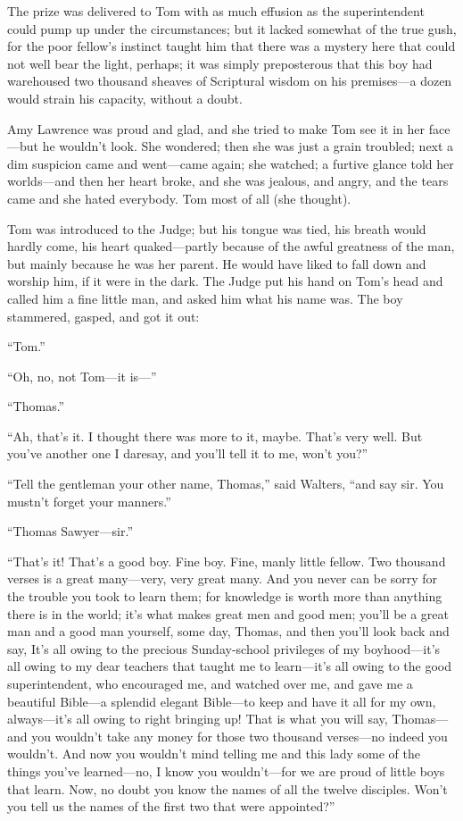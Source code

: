 \documentclass{book}
\begin{document}
The prize was delivered to Tom with as much effusion as the superintendent could pump up under the circumstances; but it lacked somewhat of the true gush, for the poor fellow’s instinct taught him that there was a mystery here that could not well bear the light, perhaps; it was simply preposterous that this boy had warehoused two thousand sheaves of Scriptural wisdom on his premises—a dozen would strain his capacity, without a doubt.

Amy Lawrence was proud and glad, and she tried to make Tom see it in her face—but he wouldn’t look. She wondered; then she was just a grain troubled; next a dim suspicion came and went—came again; she watched; a furtive glance told her worlds—and then her heart broke, and she was jealous, and angry, and the tears came and she hated everybody. Tom most of all (she thought).

Tom was introduced to the Judge; but his tongue was tied, his breath would hardly come, his heart quaked—partly because of the awful greatness of the man, but mainly because he was her parent. He would have liked to fall down and worship him, if it were in the dark. The Judge put his hand on Tom’s head and called him a fine little man, and asked him what his name was. The boy stammered, gasped, and got it out:

“Tom.”

“Oh, no, not Tom—it is—”

“Thomas.”

“Ah, that’s it. I thought there was more to it, maybe. That’s very well. But you’ve another one I daresay, and you’ll tell it to me, won’t you?”

“Tell the gentleman your other name, Thomas,” said Walters, “and say sir. You mustn’t forget your manners.”

“Thomas Sawyer—sir.”

“That’s it! That’s a good boy. Fine boy. Fine, manly little fellow. Two thousand verses is a great many—very, very great many. And you never can be sorry for the trouble you took to learn them; for knowledge is worth more than anything there is in the world; it’s what makes great men and good men; you’ll be a great man and a good man yourself, some day, Thomas, and then you’ll look back and say, It’s all owing to the precious Sunday-school privileges of my boyhood—it’s all owing to my dear teachers that taught me to learn—it’s all owing to the good superintendent, who encouraged me, and watched over me, and gave me a beautiful Bible—a splendid elegant Bible—to keep and have it all for my own, always—it’s all owing to right bringing up! That is what you will say, Thomas—and you wouldn’t take any money for those two thousand verses—no indeed you wouldn’t. And now you wouldn’t mind telling me and this lady some of the things you’ve learned—no, I know you wouldn’t—for we are proud of little boys that learn. Now, no doubt you know the names of all the twelve disciples. Won’t you tell us the names of the first two that were appointed?”
\end{document}
